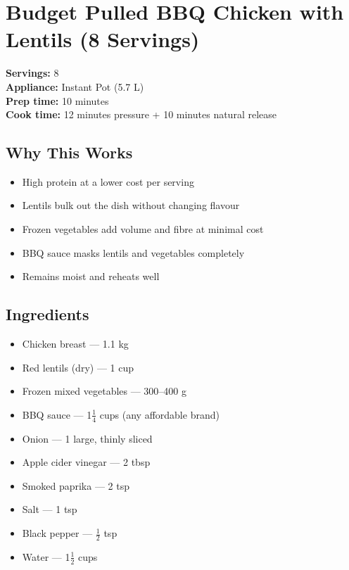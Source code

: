 \documentclass[11pt,a4paper]{article}
\begin{document}
\section*{Budget Pulled BBQ Chicken with Lentils (8 Servings)}

\textbf{Servings:} 8 \\
\textbf{Appliance:} Instant Pot (5.7 L) \\
\textbf{Prep time:} 10 minutes \\
\textbf{Cook time:} 12 minutes pressure + 10 minutes natural release

\vspace{0.5em}

\subsection*{Why This Works}
\begin{itemize}
    \item High protein at a lower cost per serving
    \item Lentils bulk out the dish without changing flavour
    \item Frozen vegetables add volume and fibre at minimal cost
    \item BBQ sauce masks lentils and vegetables completely
    \item Remains moist and reheats well
\end{itemize}

\vspace{0.5em}

\subsection*{Ingredients}
\begin{itemize}
    \item Chicken breast — 1.1 kg
    \item Red lentils (dry) — 1 cup
    \item Frozen mixed vegetables — 300--400 g
    \item BBQ sauce — 1$\tfrac{1}{4}$ cups (any affordable brand)
    \item Onion — 1 large, thinly sliced
    \item Apple cider vinegar — 2 tbsp
    \item Smoked paprika — 2 tsp
    \item Salt — 1 tsp
    \item Black pepper — $\tfrac{1}{2}$ tsp
    \item Water — 1$\tfrac{1}{2}$ cups
\end{itemize}
\end{document}
